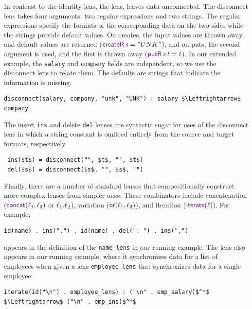 \documentclass[acmsmall,screen,anonymous]{acmart}
\begin{document}
In contrast to the identity lens, the \Disconnect lens, leaves data
unconnected. The disconnect lens takes four arguments: two regular expressions
and two strings. The regular expressions specify the formats of the
corresponding data on the two sides while the strings provide default values.
On creates, the input values are thrown away, and default values are returned ($\CreateROf{\String} =
\lstinline{"UNK"}$), and on puts, the second argument is used, and the first is
thrown away ($\PutROf{\String}{\StringAlt} = \StringAlt$).  In
our extended example, the \lstinline{salary} and
\lstinline{company} fields are independent, so we use the disconnect lens to
relate them. The defaults are strings that indicate the information is missing.
%
\begin{lstlisting}
disconnect(salary, company, "unk", "UNK") : salary $\Leftrightarrow$ company
\end{lstlisting}
%
The insert \lstinline{ins} and delete \lstinline{del} lenses are
syntactic sugar for uses of the disconnect lens in which a string
constant is omitted entirely from the source and target formats,
respectively.
\begin{lstlisting}
 ins($t$) = disconnect("", $t$, "", $t$)
 del($s$) = disconnect($s$, "", $s$, "")
\end{lstlisting}

Finally, there are a number of standard lenses that compositionally construct
more complex lenses from simpler ones. These combinators include concatenation
($\ConcatLensOf{\Lens_1}{\Lens_2}$ or $\mathit{\ell}_1 . \mathit{\ell}_2$), variation
($\OrLensOf{\Lens_1}{\Lens_2}$), and iteration ($\IterateLensOf{\Lens}$).  For example;
%
\begin{lstlisting}
id(name) . ins(",") . id(name) . del(": ") . ins(",")
\end{lstlisting}
%
appears in the definition of the \lstinline{name_lens} in our running example.
%
The \IterateLens lens also appears in our running example, where it
synchronizes data for a list of employees when given a
lens \lstinline{employee_lens} that synchronizes  data for a single employee:
%
\begin{lstlisting}
iterate(id("\n") . employee_lens) : ("\n" . emp_salary)$^*$ $\Leftrightarrow$ ("\n" . emp_ins)$^*$
\end{lstlisting}
%
\end{document}
